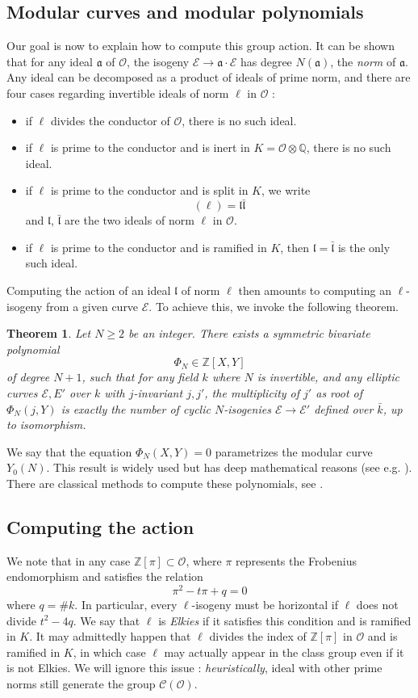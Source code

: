 \documentclass[12pt]{article}
\newtheorem{theorem}{Theorem}
\newcommand{\Q}{\mathbb{Q}}
\newcommand{\Z}{\mathbb{Z}}
\renewcommand{\frak}{\mathfrak}
\newcommand{\E}{\mathcal{E}}
\renewcommand{\O}{\mathcal{O}}
\newcommand{\Cl}{\mathcal{C}}
\begin{document}
\subsection{Modular curves and modular polynomials} Our goal is now to explain how to compute this group action. It can be shown that for any ideal $\frak a$ of $\O$, the isogeny $\E \to \frak a\cdot \E$ has degree $N(\frak a)$, the \emph{norm} of $\frak a$. Any ideal can be decomposed as a product of ideals of prime norm, and there are four cases regarding invertible ideals of norm $\ell$ in $\O$ :
\begin{itemize}
\item if $\ell$ divides the conductor of $\O$, there is no such ideal.
\item if $\ell$ is prime to the conductor and is inert in $K = \O\otimes\Q$, there is no such ideal.
\item if $\ell$ is prime to the conductor and is split in $K$, we write
$$ (\ell) = \frak l \bar{\frak l}$$
and $\frak l$, $\bar{\frak l}$ are the two ideals of norm $\ell$ in $\O$.
\item if $\ell$ is prime to the conductor and is ramified in $K$, then $\frak l = \bar{\frak l}$ is the only such ideal.
\end{itemize}
Computing the action of an ideal $\frak l$ of norm $\ell$ then amounts to computing an $\ell$-isogeny from a given curve $\E$. To achieve this, we invoke the following theorem.

\begin{theorem}
Let $N\geq 2$ be an integer. There exists a symmetric bivariate polynomial
$$\Phi_N \in \Z[X, Y]$$
of degree $N + 1$, such that for any field $k$ where $N$ is invertible, and any elliptic curves $\E, E'$ over $k$ with $j$-invariant $j, j'$, the multiplicity of $j'$ as root of $\Phi_N(j, Y)$ is exactly the number of cyclic $N$-isogenies $\E\to \E'$ defined over $\bar{k}$, up to isomorphism.
\end{theorem}

We say that the equation $\Phi_N(X, Y) = 0$ parametrizes the modular curve $Y_0(N)$. This result is widely used but has deep mathematical reasons (see e.g. \cite{DiIm}). There are classical methods to compute these polynomials, see \cite{?}.

\subsection{Computing the action} We note that in any case $\Z[\pi]\subset \O$, where $\pi$ represents the Frobenius endomorphism and satisfies the relation
$$\pi^2 - t \pi + q = 0$$
where $q = \#k$. In particular, every $\ell$-isogeny must be horizontal if $\ell$ does not divide $t^2 - 4 q$. We say that $\ell$ is \emph{Elkies} if it satisfies this condition and is ramified in $K$. It may admittedly happen that $\ell$ divides the index of $\Z[\pi]$ in $\O$ and is ramified in $K$, in which case $\ell$ may actually appear in the class group even if it is not Elkies. We will ignore this issue : \emph{heuristically}, ideal with other prime norms still generate the group $\Cl(\O)$.
\end{document}
